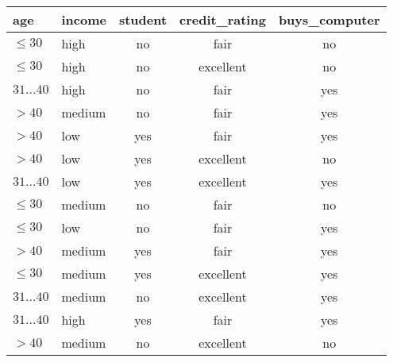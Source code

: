 \begin{tabular}{|l|l|c|c|c|}
	\hline
	\rowcolor{faugray!62}\textbf{age} & \textbf{income} & \textbf{student} & \textbf{credit\_rating} & \textbf{buys\_computer} \\\hline
	$\leq 30$                         & high            & no               & fair                    & {\color{faured}no}      \\\hline
	$\leq 30$                         & high            & no               & excellent               & {\color{faured}no}      \\\hline
	$31\ldots40$                      & high            & no               & fair                    & {\color{faugreen}yes}   \\\hline
	$>40$                             & medium          & no               & fair                    & {\color{faugreen}yes}   \\\hline
	$>40$                             & low             & yes              & fair                    & {\color{faugreen}yes}   \\\hline
	$>40$                             & low             & yes              & excellent               & {\color{faured}no}      \\\hline
	$31\ldots40$                      & low             & yes              & excellent               & {\color{faugreen}yes}   \\\hline
	$\leq 30$                         & medium          & no               & fair                    & {\color{faured}no}      \\\hline
	$\leq 30$                         & low             & no               & fair                    & {\color{faugreen}yes}   \\\hline
	$>40$                             & medium          & yes              & fair                    & {\color{faugreen}yes}   \\\hline
	$\leq 30$                         & medium          & yes              & excellent               & {\color{faugreen}yes}   \\\hline
	$31\ldots40$                      & medium          & no               & excellent               & {\color{faugreen}yes}   \\\hline
	$31\ldots40$                      & high            & yes              & fair                    & {\color{faugreen}yes}   \\\hline
	$>40$                             & medium          & no               & excellent               & {\color{faured}no}      \\\hline
\end{tabular}
